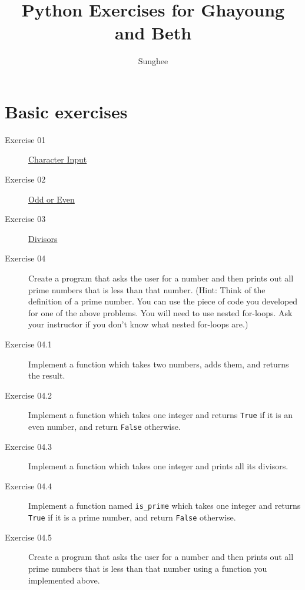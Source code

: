 \documentclass{article}
\title{Python Exercises for Ghayoung and Beth}
\author{Sunghee}
\begin{document}
\maketitle

\section{Basic exercises}

\begin{description}
\item[Exercise 01]
\href{https://www.practicepython.org/exercise/2014/01/29/01-character-input.html}{Character Input}

\item[Exercise 02]
\href{https://www.practicepython.org/exercise/2014/02/05/02-odd-or-even.html}{Odd or Even}

\item[Exercise 03]
\href{https://www.practicepython.org/exercise/2014/02/26/04-divisors.html}{Divisors}

\item[Exercise 04]
Create a program that asks the user for a number and then prints out all prime numbers that is less than that number.
(Hint: Think of the definition of a prime number. You can use the piece of code you developed for one of the above problems.
You will need to use nested for-loops. Ask your instructor if you don't know what nested for-loops are.)

\item[Exercise 04.1]
Implement a function which takes two numbers, adds them, and returns the result.

\item[Exercise 04.2]
Implement a function which takes one integer and returns {\tt True} if it is an even number,
and return {\tt False} otherwise.

\item[Exercise 04.3]
Implement a function which takes one integer and prints all its divisors.

\item[Exercise 04.4]
Implement a function named \verb+is_prime+ which takes one integer and returns {\tt True} if it is a prime number,
and return {\tt False} otherwise.

\item[Exercise 04.5]
Create a program that asks the user for a number and then prints out all prime numbers that is less than that number
using a function you implemented above.


\end{description}
\end{document}
